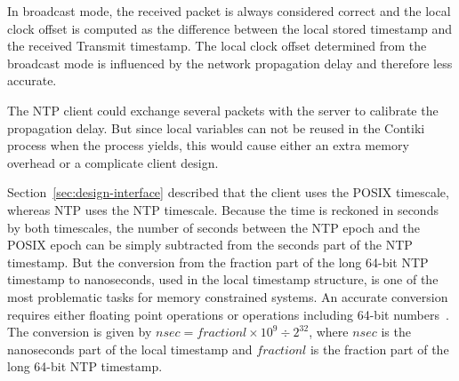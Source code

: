 In broadcast mode, the received packet is always considered correct
and the local clock offset is computed as the difference between the local stored timestamp
and the received Transmit timestamp.
The local clock offset determined from the broadcast mode
is influenced by the network propagation delay and therefore less accurate.

The NTP client could exchange several packets with the server to calibrate the propagation delay.
But since local variables can not be reused in the Contiki process when the process yields,
this would cause either an extra memory overhead or a complicate client design.





Section~\ref{sec:design-interface} described that the client uses the POSIX timescale,
whereas NTP uses the NTP timescale.
Because the time is reckoned in seconds by both timescales,
the number of seconds between the NTP epoch and the POSIX epoch
can be simply subtracted from the seconds part of the NTP timestamp.
But the conversion from the fraction part of the long 64-bit NTP timestamp to nanoseconds,
used in the local timestamp structure,
is one of the most problematic tasks for memory constrained systems.
An accurate conversion requires either floating point operations or operations including 64-bit numbers~\cite{c99}.
The conversion is given by
$nsec = fractionl \times 10^9 \div 2^{32}$, where $nsec$ is the nanoseconds part of the local timestamp
and $fractionl$ is the fraction part of the long 64-bit NTP timestamp.

